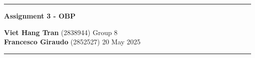 \documentclass{article}
\begin{document}
\begin{center}
\hrule
\vspace{.4cm}
\textbf{\Large Assignment 3 - OBP}
\end{center}
\textbf{Viet Hang Tran}     (2838944)  \hspace{\fill} Group 8 \\
\textbf{Francesco Giraudo}  (2852527) \hspace{\fill}  20 May 2025 \\
\hrule
\vspace{.1cm}
\end{document}

